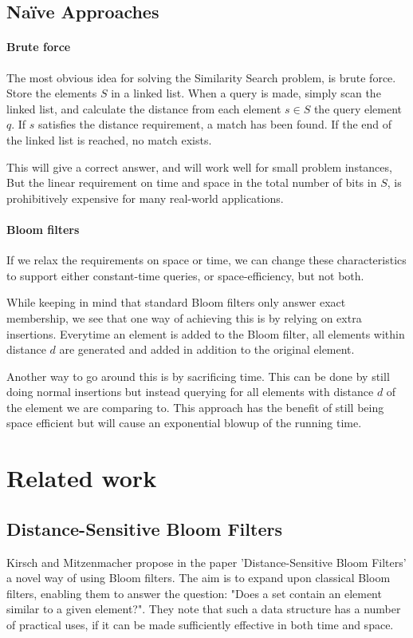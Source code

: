 \documentclass[a4paper,11pt]{article}
\begin{document}
\subsection{Naïve Approaches}
\label{naive_approaches}

\paragraph{Brute force}
The most obvious idea for solving the Similarity Search problem, is brute force. Store the elements $S$ in a linked list. When a query is made, simply scan the linked list, and calculate the distance from each element $s \in S$ the query element $q$. If $s$ satisfies the distance requirement, a match has been found. If the end of the linked list is reached, no match exists.

This will give a correct answer, and will work well for small problem instances, But the linear requirement on time and space in the total number of bits in $S$, is prohibitively expensive for many real-world applications.

\paragraph{Bloom filters} If we relax the requirements on space or time, we can change these characteristics to support either constant-time queries, or space-efficiency, but not both.

While keeping in mind that standard Bloom filters only answer exact membership, we see that one way of achieving this is by relying on extra insertions. Everytime an element is added to the Bloom filter, all elements within distance $d$ are generated and added in addition to the original element.

Another way to go around this is by sacrificing time. This can be done by still doing normal insertions but instead querying for all elements with distance $d$ of the element we are comparing to. This approach has the benefit of still being space efficient but will cause an exponential blowup of the running time.





\section{Related work} %

\subsection{Distance-Sensitive Bloom Filters}
Kirsch and Mitzenmacher propose in the paper 'Distance-Sensitive Bloom Filters'\cite{paper:harvard} a novel way of using Bloom filters. The aim is to expand upon classical Bloom filters, enabling them to answer the question: "Does a set contain an element similar to a given element?". They note that such a data structure has a number of practical uses, if it can be made sufficiently effective in both time and space.
\end{document}

